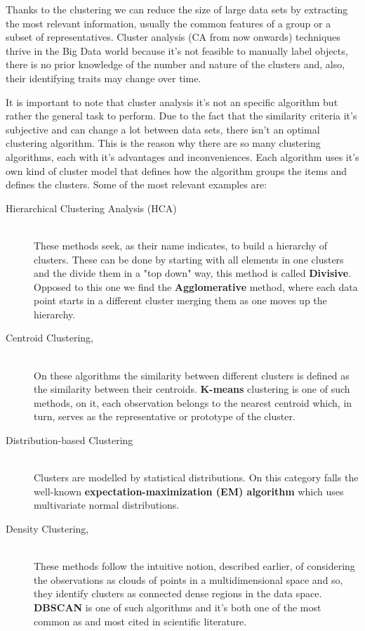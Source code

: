 Thanks to the clustering we can reduce the size of large data sets by extracting the most relevant information, usually the common features of a group or a subset of representatives. Cluster analysis (CA from now onwards) techniques thrive in the Big Data world because it's not feasible to manually label objects, there is no prior knowledge of the number and nature of the clusters and, also, their identifying traits may change over time. 

It is important to note that cluster analysis it's not an specific algorithm but rather the general task to perform. Due to the fact that the similarity criteria it's subjective and can change a lot between data sets, there isn't an optimal clustering algorithm. This is the reason why there are so many  clustering algorithms, each with it's advantages and inconveniences. Each algorithm uses it's own kind of cluster model that defines how the algorithm groups the items and defines the clusters. Some of the most relevant examples are:
\label{subsec:algorithm_kinds}
\begin{description}
\item [Hierarchical Clustering Analysis (HCA)] \hfill \\ 
These methods seek, as their name indicates, to build a hierarchy of clusters. These can be done by starting with all elements in one clusters and the divide them in a "top down" way, this method is called \textbf{Divisive}. Opposed to this one we find the \textbf{Agglomerative} method, where each data point starts in a different cluster merging them as one moves up the hierarchy.
\item [Centroid Clustering,] \hfill \\ 
On these algorithms the similarity between different clusters is defined as the similarity between their centroids. \textbf{K-means} clustering is one of such methods, on it, each observation belongs to the nearest centroid which, in turn, serves as the representative or prototype of the cluster.
\item [Distribution-based Clustering] \hfill \\ 
Clusters are modelled by statistical distributions. On this category falls the well-known \textbf{expectation-maximization (EM) algorithm} which uses multivariate normal distributions.
\item [Density Clustering,] \hfill \\ 
These methods follow the intuitive notion, described earlier, of considering the observations as clouds of points in a multidimensional space and so, they identify clusters as connected dense regions in the data space. \textbf{DBSCAN} is one of such algorithms and it's both one of the most common as and most cited in scientific literature. 
\end{description}


